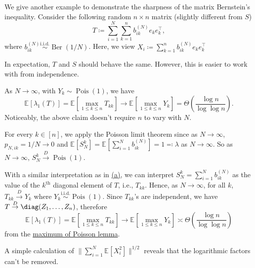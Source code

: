 \begin{remark}
	We give another example to demonstrate the sharpness of the matrix Bernstein's inequality. Consider the following random \(n \times n\) matrix (slightly different from \(S\))
	\[
		T \coloneqq \sum_{i=1}^{N} \sum_{k=1}^{n} b_{ik}^{(N)} e_k e_k ^{\top} ,
	\]
	where \(b_{ik}^{(N)} \overset{\text{i.i.d.} }{\sim } \operatorname{Ber}(1 / N) \). Here, we view \(X_i \coloneqq \sum_{k=1}^{n} b_{ik}^{(N)}e_k e_k ^{\top} \)

	\begin{intuition}
		In expectation, \(T\) and \(S\) should behave the same. However, this is easier to work with from independence.
	\end{intuition}

	\begin{claim}
		As \(N \to \infty \), with \(Y_k \sim \operatorname{Pois}(1) \), we have
		\[
			\mathbb{E}_{}[\lambda _1(T)]
			= \mathbb{E}_{}\left[ \max _{1 \leq k \leq n} T_{k k} \right]
			\to \mathbb{E}_{}\left[ \max _{1 \leq k \leq n} Y_k \right]
			= \Theta \left( \frac{\log n}{\log \log n} \right).
		\]
		Noticeably, the above claim doesn't require \(n\) to vary with \(N\).
	\end{claim}
	\begin{explanation}
		For every \(k \in [n]\), we apply the Poisson limit theorem since as \(N \to \infty \), \(p_{N, ik} = 1 / N \to 0\) and \(\mathbb{E}_{}[S^k_N] = \mathbb{E}_{}[\sum_{i=1}^{N} b^{(N)}_{ik}] = 1 \eqqcolon \lambda \) as \(N \to \infty \). So as \(N \to \infty \), \(S^k_N \overset{D}{\to} \operatorname{Pois}(1) \).

		With a similar interpretation as in \hyperref[ex5.4.14:a]{(a)}, we can interpret \(S^k_N = \sum_{i=1}^{N} b^{(N)}_{ik}\) as the value of the \(k^{\text{th} }\) diagonal element of \(T\), i.e., \(T_{k k}\). Hence, as \(N \to \infty \), for all \(k\), \(T_{k k} \overset{D}{\to} Y_k\) where \(Y_k \overset{\text{i.i.d.} }{\sim } \operatorname{Pois}(1) \). Since \(T_{k k}\)'s are independent, we have \(T \overset{D}{\to} \diag (Z_1, \dots , Z_n)\), therefore
		\[
			\mathbb{E}_{}[\lambda _1 (T)]
			= \mathbb{E}_{}\left[\max _{1 \leq k \leq n} T_{k k}\right]
			\to \mathbb{E}_{}\left[\max _{1 \leq k \leq n} Y_k \right]
			\asymp \Theta \left( \frac{\log n}{\log \log n} \right)
		\]
		from the \hyperref[lma:maximum-Poisson]{maximum of Poisson lemma}.
	\end{explanation}
	A simple calculation of \(\lVert \sum_{i=1}^{N} \mathbb{E}_{}[X_i^2] \rVert ^{1 / 2}\) reveals that the logarithmic factors can't be removed.
\end{remark}

